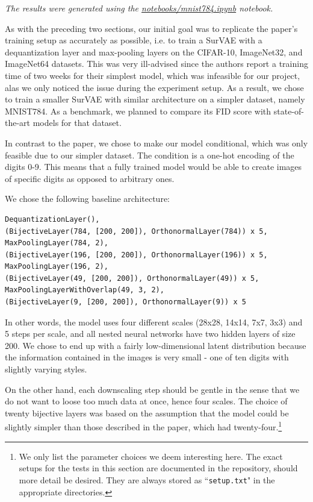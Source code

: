 \textit{The results were generated using the \href{https://github.com/xiaoxiae/GNNFinal2024/blob/main/notebooks/mnist784.ipynb}{notebooks/mnist784.ipynb} notebook.}

As with the preceding two sections, our initial goal was to replicate the paper's training setup as accurately as possible, i.e. to train a SurVAE with a dequantization layer and max-pooling layers on the CIFAR-10, ImageNet32, and ImageNet64 datasets. This was very ill-advised since the authors report a training time of two weeks for their simplest model, which was infeasible for our project, alas we only noticed the issue during the experiment setup. As a result, we chose to train a smaller SurVAE with similar architecture on a simpler dataset, namely MNIST784. As a benchmark, we planned to compare its FID score with state-of-the-art models for that dataset.

In contrast to the paper, we chose to make our model conditional, which was only feasible due to our simpler dataset. The condition is a one-hot encoding of the digits 0-9. This means that a fully trained model would be able to create images of specific digits as opposed to arbitrary ones.

We chose the following baseline architecture:

\begin{verbatim}
DequantizationLayer(),
(BijectiveLayer(784, [200, 200]), OrthonormalLayer(784)) x 5,
MaxPoolingLayer(784, 2),
(BijectiveLayer(196, [200, 200]), OrthonormalLayer(196)) x 5,
MaxPoolingLayer(196, 2),
(BijectiveLayer(49, [200, 200]), OrthonormalLayer(49)) x 5,
MaxPoolingLayerWithOverlap(49, 3, 2),
(BijectiveLayer(9, [200, 200]), OrthonormalLayer(9)) x 5
\end{verbatim}

In other words, the model uses four different scales (28x28, 14x14, 7x7, 3x3) and 5 steps per scale, and all nested neural networks have two hidden layers of size 200. We chose to end up with a fairly low-dimensional latent distribution because the information contained in the images is very small - one of ten digits with slightly varying styles.

On the other hand, each downscaling step should be gentle in the sense that we do not want to loose too much data at once, hence four scales. The choice of twenty bijective layers was based on the assumption that the model could be slightly simpler than those described in the paper, which had twenty-four.\footnote{We only list the parameter choices we deem interesting here. The exact setups for the tests in this section are documented in the repository, should more detail be desired. They are always stored as ``\texttt{setup.txt}" in the appropriate directories.}

